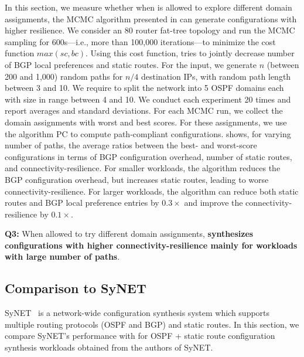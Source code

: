 In this section, we measure whether
when \name  is allowed to explore different domain assignments,
the MCMC algorithm presented in 
can 
generate configurations
with higher resilience.
We consider an 80 router fat-tree topology and run the MCMC sampling
for 600s---i.e., more than 100,000 iterations---to minimize the
 cost function $max(sc, bc)$. Using this cost function, \name
 tries to jointly decrease number of 
 BGP local preferences and static routes. 
 For the input, we generate $n$ (between
200 and 1,000) random paths for $n/4$ destination IPs, with random
path length between 3 and 10.  We require \name to split the network
into 5 OSPF domains each with size in range between 4 and 10.
We conduct each experiment 20 times and report averages and standard
deviations.  For each MCMC run, we collect the domain assignments with
worst and best scores.  For these assignments, we use the algorithm PC
to compute path-compliant configurations.
 shows, for varying number of paths, the average ratios
between the best- and worst-score configurations
in terms of
BGP configuration overhead, 
number of static routes, and 
connectivity-resilience.
For smaller workloads, 
the algorithm reduces the BGP configuration overhead, but increases 
static routes, leading to worse connectivity-resilience. For 
larger workloads, the algorithm can
reduce both static routes 
and BGP local preference entries by $0.3\times$
and improve the connectivity-resilience 
by $0.1\times$.

\textbf{Q3:}
When allowed to try different domain assignments,
\textbf{\name synthesizes configurations with higher connectivity-resilience mainly for workloads with large number of paths}.

\subsection{Comparison to SyNET}
\label{sec:synet}
SyNET~\cite{synet} is a network-wide configuration synthesis system 
which supports multiple routing protocols (OSPF and BGP) and static 
routes. In this section, we compare SyNET's performance with \name 
for OSPF + static route configuration synthesis workloads obtained from the 
authors of SyNET.

